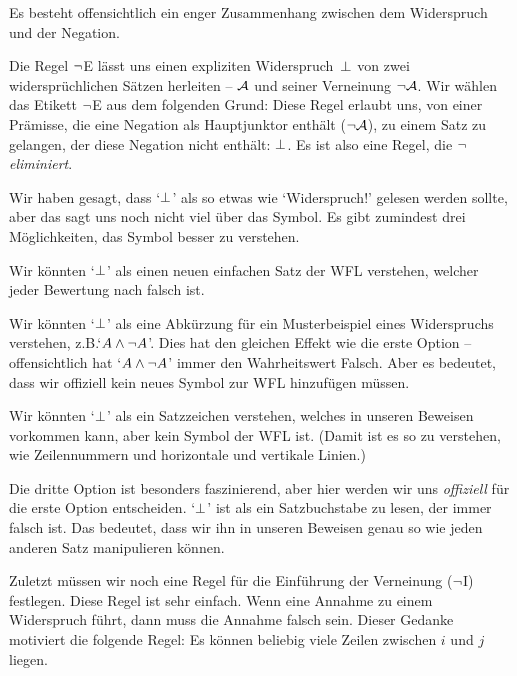 Es besteht offensichtlich ein enger Zusammenhang zwischen dem Widerspruch und der Negation. 

Die Regel $\neg$E lässt uns einen expliziten Widerspruch~$\bot$ von zwei widersprüchlichen Sätzen herleiten -- $\mathcal{A}$ und seiner Verneinung $\neg \mathcal{A}$. Wir wählen das Etikett $\neg$E aus dem folgenden Grund: Diese Regel erlaubt uns, von einer Prämisse, die eine Negation als Hauptjunktor enthält ($\neg\mathcal{A}$), zu einem Satz zu gelangen, der diese Negation nicht enthält: $\bot$. Es ist also eine Regel, die $\neg$ \emph{eliminiert}.

Wir haben gesagt, dass `$\bot$' als so etwas wie `Widerspruch!' gelesen werden sollte, aber das sagt uns noch nicht viel über das Symbol. Es gibt zumindest drei Möglichkeiten, das Symbol besser zu verstehen. 
 	\begin{ebullet}
		\item Wir könnten `$\bot$' als einen neuen einfachen Satz der WFL verstehen, welcher jeder Bewertung nach falsch ist. 
		\item Wir könnten `$\bot$' als eine Abkürzung für ein Musterbeispiel eines Widerspruchs verstehen, z.B.\@  `$A \wedge \neg A$'. Dies hat den gleichen Effekt wie die erste Option -- offensichtlich hat `$A \wedge \neg A$' immer den Wahrheitswert Falsch. Aber es bedeutet, dass wir offiziell kein neues Symbol zur WFL hinzufügen müssen.
		\item Wir könnten `$\bot$' als ein Satzzeichen verstehen, welches in unseren Beweisen vorkommen kann, aber kein Symbol der WFL ist. (Damit ist es so zu verstehen, wie Zeilennummern und horizontale und vertikale Linien.)
	\end{ebullet}
Die dritte Option ist besonders faszinierend, aber hier werden wir uns \emph{offiziell} für die erste Option entscheiden. `$\bot$' ist als ein Satzbuchstabe zu lesen, der immer falsch ist. Das bedeutet, dass wir ihn in unseren Beweisen genau so wie jeden anderen Satz manipulieren können.

Zuletzt müssen wir noch eine Regel für die Einführung der Verneinung ($\neg$I) festlegen. Diese Regel ist sehr einfach. Wenn eine Annahme zu einem Widerspruch führt, dann muss die Annahme falsch sein. Dieser Gedanke motiviert die folgende Regel:
Es können beliebig viele Zeilen zwischen $i$ und $j$ liegen. 

